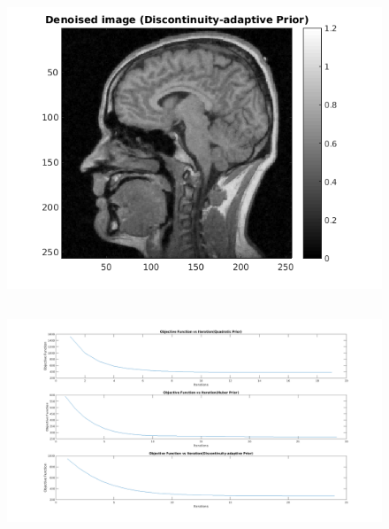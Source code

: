 \documentclass[11pt]{article}
\begin{document}
\begin{figure}[h]
\includegraphics[scale=0.7]{DenoisedDA}
\centering
\end{figure}
\FloatBarrier


\subsection{}
\begin{figure}[h]
\hspace*{-1.5in}
\includegraphics[scale=0.48]{graphs}
\centering
\end{figure}
\FloatBarrier
\end{document}
